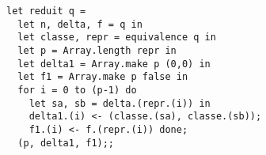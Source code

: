 \begin{Exercise}
\begin{lstlisting}
let reduit q = 
  let n, delta, f = q in
  let classe, repr = equivalence q in
  let p = Array.length repr in
  let delta1 = Array.make p (0,0) in
  let f1 = Array.make p false in
  for i = 0 to (p-1) do
    let sa, sb = delta.(repr.(i)) in
    delta1.(i) <- (classe.(sa), classe.(sb));
    f1.(i) <- f.(repr.(i)) done;
  (p, delta1, f1);;
\end{lstlisting}
\end{Exercise}






